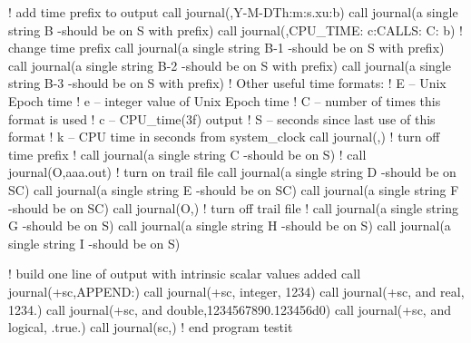 ! add time prefix to output call journal(\textquotesingle{}\textquotesingle{},\textquotesingle{}Y-\/M-\/DTh\+:m\+:s.xu\+:b\textquotesingle{}) call journal(\textquotesingle{}a single string B -\/should be on S with prefix\textquotesingle{}) call journal(\textquotesingle{}\textquotesingle{},\textquotesingle{}C\+P\+U\+\_\+\+T\+I\+ME\+: c\+:C\+A\+L\+LS\+: C\+: b\textquotesingle{}) ! change time prefix call journal(\textquotesingle{}a single string B-\/1 -\/should be on S with prefix\textquotesingle{}) call journal(\textquotesingle{}a single string B-\/2 -\/should be on S with prefix\textquotesingle{}) call journal(\textquotesingle{}a single string B-\/3 -\/should be on S with prefix\textquotesingle{}) ! Other useful time formats\+: ! E -- Unix Epoch time ! e -- integer value of Unix Epoch time ! C -- number of times this format is used ! c -- C\+P\+U\+\_\+time(3f) output ! S -- seconds since last use of this format ! k -- C\+PU time in seconds from system\+\_\+clock call journal(\textquotesingle{}\textquotesingle{},\textquotesingle{}\textquotesingle{}) ! turn off time prefix ! call journal(\textquotesingle{}a single string C -\/should be on S\textquotesingle{}) ! call journal(\textquotesingle{}O\textquotesingle{},\textquotesingle{}aaa.\+out\textquotesingle{}) ! turn on trail file call journal(\textquotesingle{}a single string D -\/should be on SC\textquotesingle{}) call journal(\textquotesingle{}a single string E -\/should be on SC\textquotesingle{}) call journal(\textquotesingle{}a single string F -\/should be on SC\textquotesingle{}) call journal(\textquotesingle{}O\textquotesingle{},\textquotesingle{}\textquotesingle{}) ! turn off trail file ! call journal(\textquotesingle{}a single string G -\/should be on S\textquotesingle{}) call journal(\textquotesingle{}a single string H -\/should be on S\textquotesingle{}) call journal(\textquotesingle{}a single string I -\/should be on S\textquotesingle{})

! build one line of output with intrinsic scalar values added call journal(\textquotesingle{}+sc\textquotesingle{},\textquotesingle{}A\+P\+P\+E\+ND\+:\textquotesingle{}) call journal(\textquotesingle{}+sc\textquotesingle{},\textquotesingle{} integer\textquotesingle{}, 1234) call journal(\textquotesingle{}+sc\textquotesingle{},\textquotesingle{} and real\textquotesingle{}, 1234.) call journal(\textquotesingle{}+sc\textquotesingle{},\textquotesingle{} and double\textquotesingle{},1234567890.\+123456d0) call journal(\textquotesingle{}+sc\textquotesingle{},\textquotesingle{} and logical\textquotesingle{}, .true.) call journal(\textquotesingle{}sc\textquotesingle{},\textquotesingle{}\textquotesingle{}) ! end program testit

